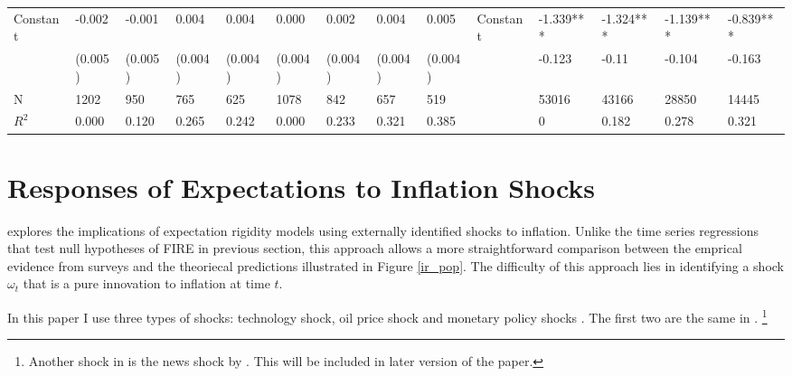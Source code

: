 \documentclass[]{article}
\begin{document}
\begin{table}
\begin{adjustbox}{width={24cm},totalheight={14cm},angle=90}
\begin{tabular}{llllllllllllll}
		Constant               & -0.002      & -0.001    & 0.004     & 0.004     & 0.000         & 0.002     & 0.004     & 0.005     &   Constant                   & -1.339***     & -1.324*** & -1.139*** & -0.839*** \\
		& (0.005)     & (0.005)   & (0.004)   & (0.004)   & (0.004)       & (0.004)   & (0.004)   & (0.004)   &                      & -0.123        & -0.11     & -0.104    & -0.163    \\
		\hline 
		N                    & 1202        & 950       & 765       & 625       & 1078          & 842       & 657       & 519       &                      & 53016         & 43166     & 28850     & 14445     \\
		$R^2$ & 0.000       & 0.120     & 0.265     & 0.242     & 0.000         & 0.233     & 0.321     & 0.385     &                      & 0             & 0.182     & 0.278     & 0.321  \\
		\hline    
	\end{tabular}
\end{adjustbox}
\end{table}
	
\section{Responses of Expectations to Inflation Shocks }\label{IRShocks}

 \citet{coibion2012can} explores the implications of expectation rigidity models using externally identified shocks to inflation.  Unlike the time series regressions that test null hypotheses of FIRE in previous section, this approach allows a more straightforward comparison between the emprical evidence from surveys and the theoriecal predictions illustrated in Figure \ref{ir_pop}. The difficulty of this approach lies in identifying a shock $\omega_t$ that is a pure innovation to inflation at time $t$. 
 
In this paper I use three types of shocks: technology shock\citet{gali1999technology}, oil price shock\citet{hamilton1996happened} and monetary policy shocks \citet{laseen2011anticipated}. The first two are the same in \citet{coibion2012can}. \footnote{ Another shock in \citet{coibon2012can} is the news shock by \citet{barsky2011news}. This will be included in later version of the paper.} 
\end{document}
